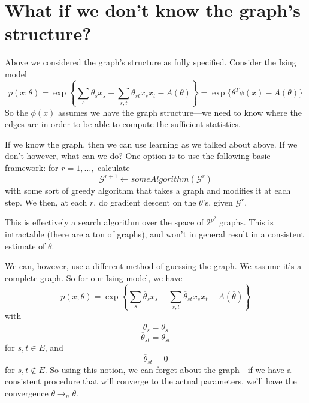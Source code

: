 \documentclass{article}
\begin{document}
\section{What if we don't know the graph's structure?}

Above we considered the graph's structure as fully specified.
Consider the Ising model
$$
p(x;\theta) = 
\exp\left\{
	\sum_s \theta_s x_s
	+
	\sum_{s,t} \theta_{st} x_s x_t
	- A(\theta)
\right\}
= \exp\{\theta^T \phi(x) - A(\theta)\}
$$
So the $\phi(x)$ assumes we have the graph structure---we need to know where the edges are in order to be able to compute the sufficient statistics.

If we know the graph, then we can use learning as we talked about above.
If we don't however, what can we do?
One option is to use the following basic framework: for $r = 1,\ldots,$ calculate
$$
\mathcal G^{r+1}
\leftarrow
someAlgorithm(\mathcal G^{r})
$$
with some sort of greedy algorithm that takes a graph and modifies it at each step.
We then, at each $r$,
 do gradient descent on the $\theta$'s, given $\mathcal G^r$.
 
 This is effectively a search algorithm over the space of $2^{p^2}$ graphs.
 This is intractable (there are a ton of graphs), and won't in general result in a consistent estimate of $\theta$.
 
We can, however, use a different method of guessing the graph.
We assume it's a complete graph.
So for our Ising model, we have
$$
p(x;\theta) = 
\exp\left\{
	\sum_s \overline \theta_s x_s + 
	\sum_{s,t} \overline\theta_{st} x_s x_t
	- A(\overline\theta)
\right\}
$$
with
$$
\overline\theta_s = \theta_s
$$
$$
\overline\theta_{st} = \theta_{st}
$$
for $s,t\in E$,
and
$$
\overline\theta_{st} = 0
$$
for $s,t \not\in E$.
So using this notion, we can forget about the graph---if we have a consistent procedure that will
converge to the actual parameters, we'll have the convergence $\overline\theta \rightarrow_n \theta$.
\end{document}
